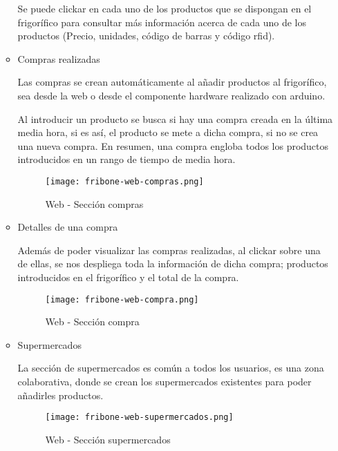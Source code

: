 \begin{itemize}
\begin{itemize}
                Se puede clickar en cada uno de los productos que se dispongan en el frigorífico para consultar más información acerca de cada uno de los productos (Precio, unidades, código de barras y código rfid).

                \item Compras realizadas

                Las compras se crean automáticamente al añadir productos al frigorífico, sea desde la web o desde el componente hardware realizado con arduino.

                Al introducir un producto se busca si hay una compra creada en la última media hora, si es así, el producto se mete a dicha compra, si no se crea una nueva compra. En resumen, una compra engloba todos los productos introducidos en un rango de tiempo de media hora.

                \begin{figure}[H]
                    \centering
                    \texttt{[image: fribone-web-compras.png]}
                    \caption{Web - Sección compras}\label{fig:fribone-web-compras}
                \end{figure}

                \item Detalles de una compra

                Además de poder visualizar las compras realizadas, al clickar sobre una de ellas, se nos despliega toda la información de dicha compra; productos introducidos en el frigorífico y el total de la compra.

                \begin{figure}[H]
                    \centering
                    \texttt{[image: fribone-web-compra.png]}
                    \caption{Web - Sección compra}\label{fig:fribone-web-compra}
                \end{figure}

                \item Supermercados

                    La sección de supermercados es común a todos los usuarios, es una zona colaborativa, donde se crean los supermercados existentes para poder añadirles productos.

                    \begin{figure}[H]
                        \centering
                        \texttt{[image: fribone-web-supermercados.png]}
                        \caption{Web - Sección supermercados}\label{fig:fribone-web-supermercados}
                    \end{figure}


\end{itemize}
\end{itemize}
